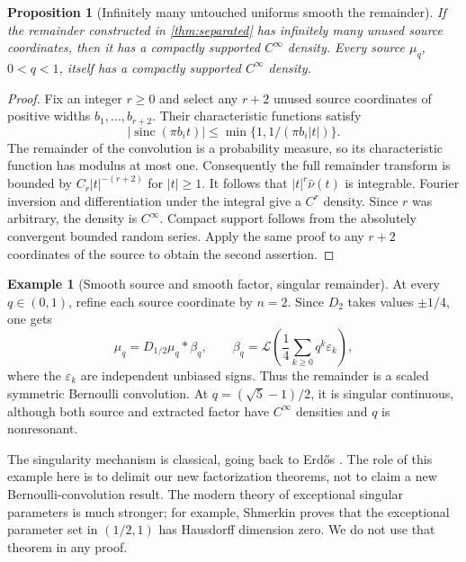 \documentclass[11pt,letterpaper]{article}
\newtheorem{proposition}[theorem]{Proposition}
\theoremstyle{definition}
\newtheorem{example}[theorem]{Example}
\theoremstyle{remark}
\newcommand{\Law}{\mathcal L}
\newcommand{\sinc}{\operatorname{sinc}}
\numberwithin{equation}{section}
\begin{document}
\begin{proposition}[Infinitely many untouched uniforms smooth the remainder]\label{prop:smooth}
If the remainder constructed in \cref{thm:separated} has infinitely many unused source coordinates, then it has a compactly supported $C^\infty$ density. Every source $\mu_q$, $0<q<1$, itself has a compactly supported $C^\infty$ density.
\end{proposition}
\begin{proof}
Fix an integer $r\ge0$ and select any $r+2$ unused source coordinates of positive widths $b_1,\ldots,b_{r+2}$. Their characteristic functions satisfy
\[
 |\sinc(\pi b_i t)|\le\min\{1,1/(\pi b_i|t|)\}.
\]
The remainder of the convolution is a probability measure, so its characteristic function has modulus at most one. Consequently the full remainder transform is bounded by $C_r|t|^{-(r+2)}$ for $|t|\ge1$. It follows that $|t|^r\widehat\nu(t)$ is integrable. Fourier inversion and differentiation under the integral give a $C^r$ density. Since $r$ was arbitrary, the density is $C^\infty$. Compact support follows from the absolutely convergent bounded random series. Apply the same proof to any $r+2$ coordinates of the source to obtain the second assertion.
\end{proof}

\begin{example}[Smooth source and smooth factor, singular remainder]\label{ex:singular}
At every $q\in(0,1)$, refine each source coordinate by $n=2$. Since $D_2$ takes values $\pm1/4$, one gets
\begin{equation}\label{eq:bernoulli}
 \mu_q=D_{1/2}\mu_q*\beta_q,\qquad
 \beta_q=\Law\left(\frac14\sum_{k\ge0}q^k\varepsilon_k\right),
\end{equation}
where the $\varepsilon_k$ are independent unbiased signs. Thus the remainder is a scaled symmetric Bernoulli convolution. At $q=(\sqrt5-1)/2$, it is singular continuous, although both source and extracted factor have $C^\infty$ densities and $q$ is nonresonant.

The singularity mechanism is classical, going back to Erd\H{o}s \cite{erdos}. The role of this example here is to delimit our new factorization theorems, not to claim a new Bernoulli-convolution result. The modern theory of exceptional singular parameters is much stronger; for example, Shmerkin \cite{shmerkin} proves that the exceptional parameter set in $(1/2,1)$ has Hausdorff dimension zero. We do not use that theorem in any proof.
\end{example}
\end{document}
